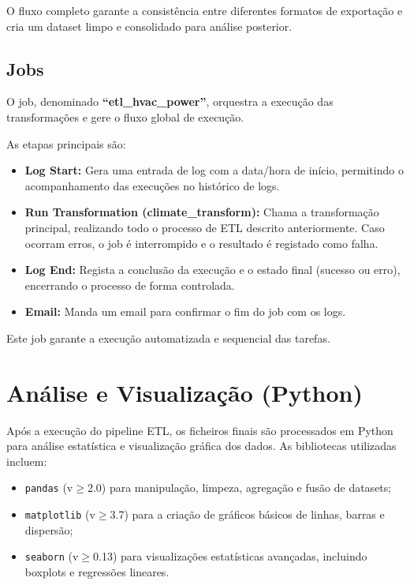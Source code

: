 \documentclass[a4paper, 12pt]{article} %
\begin{document}
O fluxo completo garante a consistência entre diferentes formatos de exportação e cria um dataset limpo e consolidado para análise posterior.

\subsection{Jobs}

O job, denominado \textbf{``etl\_hvac\_power''}, orquestra a execução das transformações e gere o fluxo global de execução.

As etapas principais são:

\begin{itemize}
	\item \textbf{Log Start:}  
	Gera uma entrada de log com a data/hora de início, permitindo o acompanhamento das execuções no histórico de logs.
	
	\item \textbf{Run Transformation (climate\_transform):}  
	Chama a transformação principal, realizando todo o processo de ETL descrito anteriormente.  
	Caso ocorram erros, o job é interrompido e o resultado é registado como falha.
	
	\item \textbf{Log End:}  
	Regista a conclusão da execução e o estado final (sucesso ou erro), encerrando o processo de forma controlada.
	
	\item \textbf{Email:}
	Manda um email para confirmar o fim do job com os logs.
\end{itemize}

Este job garante a execução automatizada e sequencial das tarefas.


\newpage
\section{Análise e Visualização (Python)}

Após a execução do pipeline ETL, os ficheiros finais são processados em Python para análise estatística e visualização gráfica dos dados.  
As bibliotecas utilizadas incluem:

\begin{itemize}
	\item \texttt{pandas} (v$\geq$2.0) para manipulação, limpeza, agregação e fusão de datasets;
	\item \texttt{matplotlib} (v$\geq$3.7) para a criação de gráficos básicos de linhas, barras e dispersão;
	\item \texttt{seaborn} (v$\geq$0.13) para visualizações estatísticas avançadas, incluindo boxplots e regressões lineares.
\end{itemize}
\end{document}
